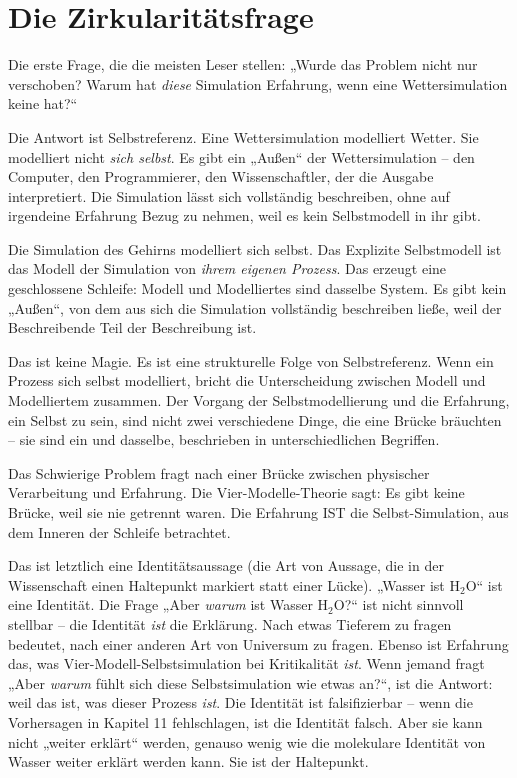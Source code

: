\documentclass[11pt, twoside, openright]{book}
\begin{document}
\section*{Die Zirkularitätsfrage}

Die erste Frage, die die meisten Leser stellen: „Wurde das Problem nicht nur verschoben? Warum hat \textit{diese} Simulation Erfahrung, wenn eine Wettersimulation keine hat?“

Die Antwort ist Selbstreferenz. Eine Wettersimulation modelliert Wetter. Sie modelliert nicht \textit{sich selbst}. Es gibt ein „Außen“ der Wettersimulation -- den Computer, den Programmierer, den Wissenschaftler, der die Ausgabe interpretiert. Die Simulation lässt sich vollständig beschreiben, ohne auf irgendeine Erfahrung Bezug zu nehmen, weil es kein Selbstmodell in ihr gibt.

Die Simulation des Gehirns modelliert sich selbst. Das Explizite Selbstmodell ist das Modell der Simulation von \textit{ihrem eigenen Prozess}. Das erzeugt eine geschlossene Schleife: Modell und Modelliertes sind dasselbe System. Es gibt kein „Außen“, von dem aus sich die Simulation vollständig beschreiben ließe, weil der Beschreibende Teil der Beschreibung ist.

Das ist keine Magie. Es ist eine strukturelle Folge von Selbstreferenz. Wenn ein Prozess sich selbst modelliert, bricht die Unterscheidung zwischen Modell und Modelliertem zusammen. Der Vorgang der Selbstmodellierung und die Erfahrung, ein Selbst zu sein, sind nicht zwei verschiedene Dinge, die eine Brücke bräuchten -- sie sind ein und dasselbe, beschrieben in unterschiedlichen Begriffen.

Das Schwierige Problem fragt nach einer Brücke zwischen physischer Verarbeitung und Erfahrung. Die Vier-Modelle-Theorie sagt: Es gibt keine Brücke, weil sie nie getrennt waren. Die Erfahrung IST die Selbst-Simulation, aus dem Inneren der Schleife betrachtet.

Das ist letztlich eine Identitätsaussage (die Art von Aussage, die in der Wissenschaft einen Haltepunkt markiert statt einer Lücke). „Wasser ist H$_2$O“ ist eine Identität. Die Frage „Aber \textit{warum} ist Wasser H$_2$O?“ ist nicht sinnvoll stellbar -- die Identität \textit{ist} die Erklärung. Nach etwas Tieferem zu fragen bedeutet, nach einer anderen Art von Universum zu fragen. Ebenso ist Erfahrung das, was Vier-Modell-Selbstsimulation bei Kritikalität \textit{ist}. Wenn jemand fragt „Aber \textit{warum} fühlt sich diese Selbstsimulation wie etwas an?“, ist die Antwort: weil das ist, was dieser Prozess \textit{ist}. Die Identität ist falsifizierbar -- wenn die Vorhersagen in Kapitel 11 fehlschlagen, ist die Identität falsch. Aber sie kann nicht „weiter erklärt“ werden, genauso wenig wie die molekulare Identität von Wasser weiter erklärt werden kann. Sie ist der Haltepunkt.
\end{document}
